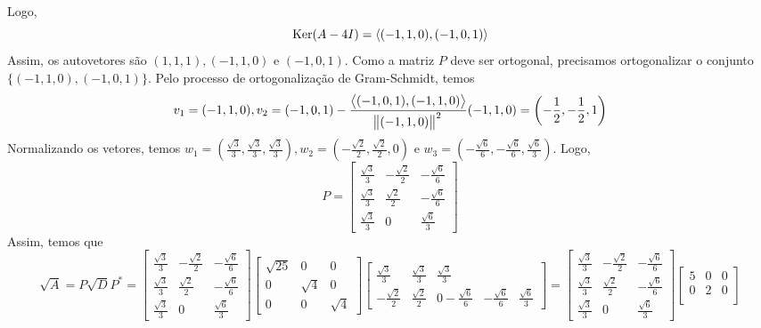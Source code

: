 \documentclass[11pt,a4paper]{article}
\begin{document}
{\[\]
Logo, 
\[
\operatorname{Ker}(A - 4I) = \langle (-1,1,0), (-1,0,1) \rangle
\]
Assim, os autovetores são $(1,1,1),(-1,1,0)$ e $(-1,0,1).$ Como a matriz $P$ deve ser ortogonal, precisamos ortogonalizar o conjunto $\{ (-1,1,0),(-1,0,1)\}.$ Pelo processo de ortogonalização de Gram-Schmidt, temos
\[
v_1 =  (-1,1,0), v_2 = (-1,0,1) - \frac{\left\langle (-1,0,1),(-1,1,0) \right\rangle}{\norm{(-1,1,0)}^2}(-1,1,0) = \left(- \frac{1}{2}, - \frac{1}{2}, 1  \right) 
\]
Normalizando os vetores, temos $w_1 = \left( \frac{\sqrt{3}}{3}, \frac{\sqrt{3}}{3}, \frac{\sqrt{3}}{3} \right), w_2 = \left( - \frac{\sqrt{2}}{2}, \frac{\sqrt{2}}{2}, 0 \right)$ e $w_3 = \left( - \frac{\sqrt{6}}{6}, - \frac{\sqrt{6}}{6},  \frac{\sqrt{6}}{3}  \right).$
Logo, 
\[
P = \begin{bmatrix}
 \frac{\sqrt{3}}{3} & - \frac{\sqrt{2}}{2} & - \frac{\sqrt{6}}{6} \\
 \frac{\sqrt{3}}{3} & \frac{\sqrt{2}}{2} & - \frac{\sqrt{6}}{6} \\
 \frac{\sqrt{3}}{3} & 0 &  \frac{\sqrt{6}}{3}  
\end{bmatrix}
\]
Assim, temos que
\[
\sqrt{A} = P\sqrt{D}P^{*} =  \begin{bmatrix}
 \frac{\sqrt{3}}{3} & - \frac{\sqrt{2}}{2} & - \frac{\sqrt{6}}{6} \\
 \frac{\sqrt{3}}{3} & \frac{\sqrt{2}}{2} & - \frac{\sqrt{6}}{6} \\
 \frac{\sqrt{3}}{3} & 0 &  \frac{\sqrt{6}}{3}  
\end{bmatrix}\begin{bmatrix}
\sqrt{25} & 0 & 0 \\
0 & \sqrt{4} & 0 \\
0 & 0 & \sqrt{4} 
\end{bmatrix}\begin{bmatrix}
 \frac{\sqrt{3}}{3} &  \frac{\sqrt{3}}{3}  &  \frac{\sqrt{3}}{3} \\
- \frac{\sqrt{2}}{2} &\frac{\sqrt{2}}{2} & 0 
- \frac{\sqrt{6}}{6} & - \frac{\sqrt{6}}{6}&  \frac{\sqrt{6}}{3}  
\end{bmatrix} = \begin{bmatrix}
 \frac{\sqrt{3}}{3} & - \frac{\sqrt{2}}{2} & - \frac{\sqrt{6}}{6} \\
 \frac{\sqrt{3}}{3} & \frac{\sqrt{2}}{2} & - \frac{\sqrt{6}}{6} \\
 \frac{\sqrt{3}}{3} & 0 &  \frac{\sqrt{6}}{3}  
\end{bmatrix}\begin{bmatrix}
5 & 0 & 0 \\
0 & 2 & 0 \\

\end{bmatrix}\]}
\end{document}
